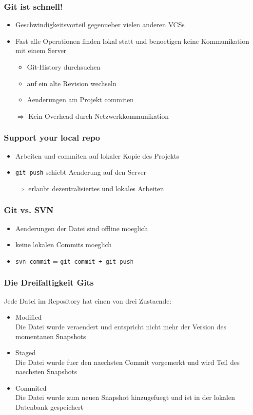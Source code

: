 \documentclass[12pt,utf8]{beamer}
\begin{document}

	\begin{frame}
		\frametitle{Git ist schnell!}
		\begin{itemize}
			\item Geschwindigkeitsvorteil gegenueber vielen anderen VCSs
			\item Fast alle Operationen finden lokal statt und benoetigen keine Kommunikation mit einem Server
			\begin{itemize}
				\item Git-History durchsuchen
				\item auf ein alte Revision wechseln
				\item Aenderungen am Projekt commiten
			\end{itemize}
			\item[$\Rightarrow$] Kein Overhead durch Netzwerkkommunikation
		\end{itemize}
	\end{frame}
	
	\begin{frame}
		\frametitle{Support your local repo}
		\begin{itemize}
			\item Arbeiten und commiten auf lokaler Kopie des Projekts
			\item \texttt{git push} schiebt Aenderung auf den Server
			\item[$\Rightarrow$] erlaubt dezentralisiertes und lokales Arbeiten 
		\end{itemize}
	\end{frame}
	
	\begin{frame}
		\frametitle{Git vs. SVN}
		\begin{itemize}
			\item Aenderungen der Datei sind offline moeglich
			\item keine lokalen Commits moeglich
			\item \texttt{svn commit} = \texttt{git commit + git push}
		\end{itemize}
	\end{frame}

	\begin{frame}
		\frametitle{Die Dreifaltigkeit Gits}
		Jede Datei im Repository hat einen von drei Zustaende:
		\begin{itemize}
			\item Modified\\
				Die Datei wurde veraendert und entspricht nicht mehr der Version des momentanen Snapshots
			\item Staged\\
				Die Datei wurde fuer den naechsten Commit vorgemerkt und wird Teil des naechsten Snapshots
			\item Commited\\
				Die Datei wurde zum neuen Snapshot hinzugefuegt und ist in der lokalen Datenbank gespeichert
		\end{itemize}
	\end{frame}
\end{document}

